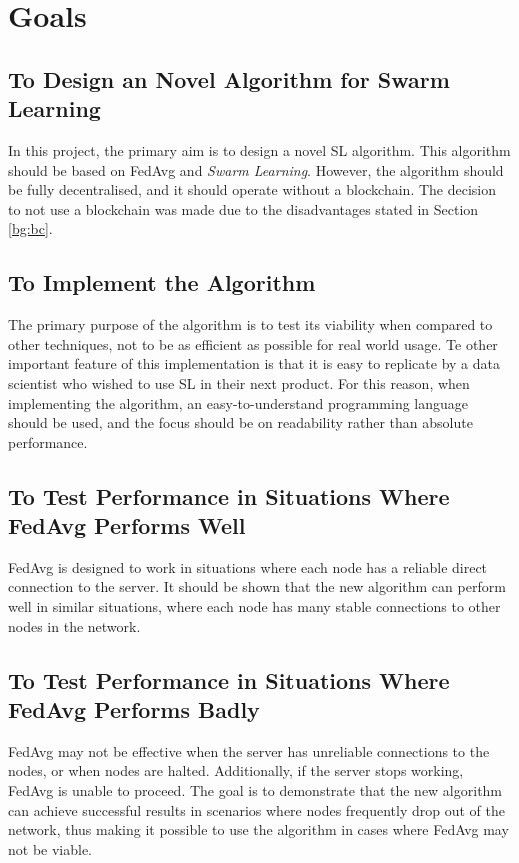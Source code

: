\section{Goals} \label{goals}

\subsection{To Design an Novel Algorithm for Swarm Learning}
In this project, the primary aim is to design a novel SL algorithm. This algorithm should be based on FedAvg and \emph{Swarm Learning}. However, the algorithm should be fully decentralised, and it should operate without a blockchain. The decision to not use a blockchain was made due to the disadvantages stated in Section \ref{bg:bc}.

\subsection{To Implement the Algorithm}
The primary purpose of the algorithm is to test its viability when compared to other techniques, not to be as efficient as possible for real world usage. Te other important feature of this implementation is that it is easy to replicate by a data scientist who wished to use SL in their next product. For this reason, when implementing the algorithm, an easy-to-understand programming language should be used, and the focus should be on readability rather than absolute performance.

\subsection{To Test Performance in Situations Where FedAvg Performs Well}
FedAvg is designed to work in situations where each node has a reliable direct connection to the server. It should be shown that the new algorithm can perform well in similar situations, where each node has many stable connections to other nodes in the network.

\subsection{To Test Performance in Situations Where FedAvg Performs Badly}
FedAvg may not be effective when the server has unreliable connections to the nodes, or when nodes are halted. Additionally, if the server stops working, FedAvg is unable to proceed. The goal is to demonstrate that the new algorithm can achieve successful results in scenarios where nodes frequently drop out of the network, thus making it possible to use the algorithm in cases where FedAvg may not be viable.